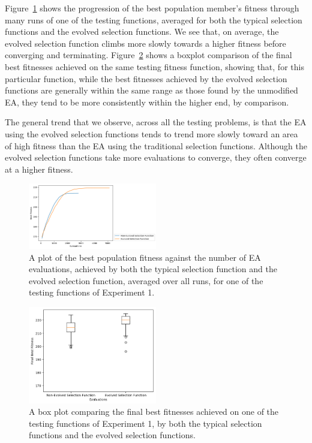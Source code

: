 \documentclass[sigconf]{acmart}
\begin{document}
Figure~\ref{fig:Experiment1LinePlot} shows the progression of the best population member's fitness through many runs of one of the testing functions, averaged for both the typical selection functions and the evolved selection functions. We see that, on average, the evolved selection function climbs more slowly towards a higher fitness before converging and terminating. Figure~\ref{fig:Experiment1Boxplot} shows a boxplot comparison of the final best fitnesses achieved on the same testing fitness function, showing that, for this particular function, while the best fitnesses achieved by the evolved selection functions are generally within the same range as those found by the unmodified EA, they tend to be more consistently within the higher end, by comparison.

The general trend that we observe, across all the testing problems, is that the EA using the evolved selection functions tends to trend more slowly toward an area of high fitness than the EA using the traditional selection functions. Although the evolved selection functions take more evaluations to converge, they often converge at a higher fitness.
\begin{figure}
	\centering
	\includegraphics[width=0.5\textwidth]{Experiment1LinePlot}
	\caption{A plot of the best population fitness against the number of EA evaluations, achieved by both the typical selection function and the evolved selection function, averaged over all runs, for one of the testing functions of Experiment 1.}
	\label{fig:Experiment1LinePlot}
\end{figure}

\begin{figure}
	\centering
	\includegraphics[width=0.5\textwidth]{Experiment1Boxplot}
	\caption{A box plot comparing the final best fitnesses achieved on one of the testing functions of Experiment 1, by both the typical selection functions and the evolved selection functions.}
	\label{fig:Experiment1Boxplot}
\end{figure}
\end{document}
